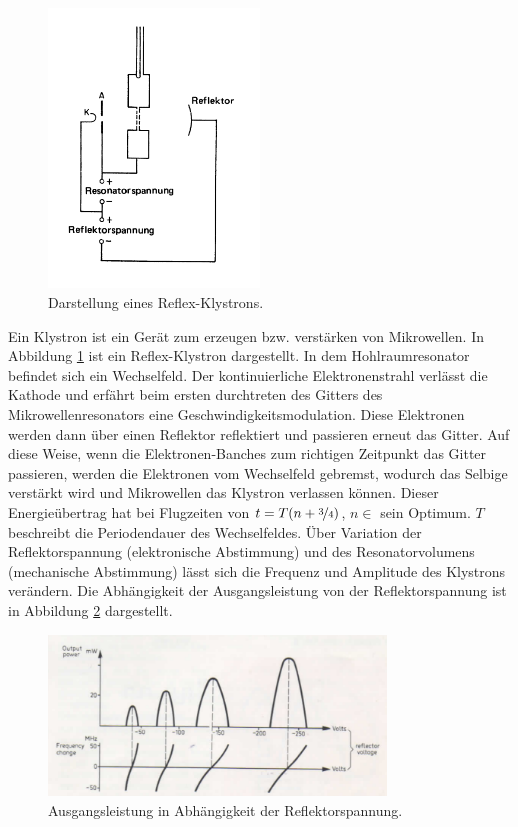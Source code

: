 \begin{figure}
    \centering
    \includegraphics[width=0.5\textwidth]{Bilder/reflex_klystron.PNG}
    \caption{Darstellung eines Reflex-Klystrons.\cite{Mikrowellen}}
    \label{fig:klystron}
\end{figure}

Ein Klystron ist ein Gerät zum erzeugen bzw. verstärken von Mikrowellen. In Abbildung \ref{fig:klystron} ist ein Reflex-Klystron dargestellt. In dem Hohlraumresonator befindet sich ein Wechselfeld. Der kontinuierliche Elektronenstrahl verlässt die Kathode und erfährt beim ersten durchtreten des Gitters des Mikrowellenresonators eine Geschwindigkeitsmodulation. Diese Elektronen werden dann über einen Reflektor reflektiert und passieren erneut das Gitter. Auf diese Weise, wenn die Elektronen-Banches zum richtigen Zeitpunkt das Gitter passieren, werden die Elektronen vom Wechselfeld gebremst, wodurch das Selbige verstärkt wird und Mikrowellen das Klystron verlassen können. Dieser Energieübertrag hat bei Flugzeiten von $t = T(n+\nicefrac{3}{4})$, $n \in $ sein Optimum. $T$ beschreibt die Periodendauer des Wechselfeldes. Über Variation der Reflektorspannung (elektronische Abstimmung) und des Resonatorvolumens (mechanische Abstimmung)
lässt sich die Frequenz und Amplitude des Klystrons verändern. Die Abhängigkeit der Ausgangsleistung von der Reflektorspannung ist in Abbildung \ref{fig:reflektor} dargestellt.

\begin{figure}
    \centering
    \includegraphics[width=0.8\textwidth]{Bilder/reflektor.PNG}
    \caption{Ausgangsleistung in Abhängigkeit der Reflektorspannung.\cite{Mikrowellen}}
    \label{fig:reflektor}
\end{figure}

